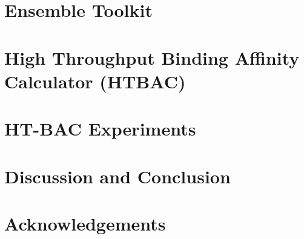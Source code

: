 \documentclass[conference]{IEEEtran}
\begin{document}
\section{Ensemble Toolkit}\label{sec:4}




\section{High Throughput Binding Affinity Calculator (HTBAC)}\label{sec:ht-bac}



\section{HT-BAC Experiments}\label{sec:6}



\section{Discussion and Conclusion}\label{sec:conclusion}



\section*{Acknowledgements}





\end{document}
